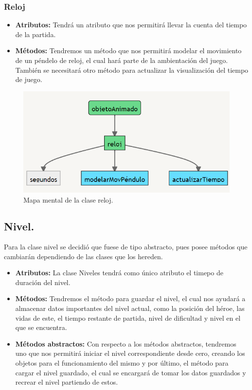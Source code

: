 \documentclass{article}
\begin{document}
    
    \subsubsection{Reloj}
    \begin{itemize}
        \item \textbf{Atributos:} Tendrá un atributo que nos permitirá llevar la cuenta del tiempo de la partida.
        \item \textbf{Métodos:} Tendremos un método que nos permitirá modelar el movimiento de un péndelo de reloj, el cual hará parte de la ambientación del juego. También se necesitará otro método para actualizar la visualización del tiempo de juego.
    \end{itemize}
    
    
\begin{figure}[h]
\includegraphics[scale=0.8]{Images/reloj.png}
\centering
\caption{Mapa mental de la clase reloj.}
\label{fig:mmreloj}
\end{figure}


\subsection{Nivel.}\label{niveles}
Para la clase nivel se decidió que fuese de tipo abstracto, pues posee métodos que cambiarán dependiendo de las clases que los hereden.
\begin{itemize}
  \item \textbf{Atributos:} La clase Niveles tendrá como único atributo el timepo de duración del nivel.
  
  \item \textbf{Métodos:} Tendremos el método para guardar el nivel, el cual nos ayudará a almacenar datos importantes del nivel actual, como la posición del héroe, las vidas de este, el tiempo restante de partida, nivel de dificultad y nivel en el que se encuentra.
  
  \item \textbf{Métodos abstractos:}  Con respecto a los métodos abstractos, tendremos uno que nos permitirá iniciar el nivel correspondiente desde cero, creando los objetos para el funcionamiento del mismo y por último, el método para cargar el nivel guardado, el cual se encargará de tomar los datos guardados y recrear el nivel partiendo de estos. 
  
\end{itemize}
\end{document}
